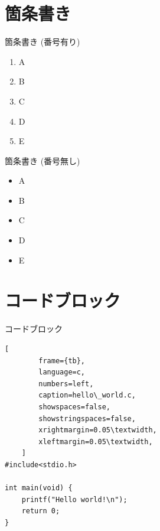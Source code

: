 \documentclass[aspectratio=169]{beamer}
\begin{document}
\section{箇条書き}
\begin{frame}{箇条書き (番号有り)}
    \begin{enumerate}
        \item A
        \item B
        \item C
        \item D
        \item E
    \end{enumerate}
\end{frame}

\begin{frame}{箇条書き (番号無し)}
    \begin{itemize}
        \item A
        \item B
        \item C
        \item D
        \item E
    \end{itemize}
\end{frame}

\section{コードブロック}
\begin{frame}[fragile]{コードブロック}
    \begin{lstlisting}[
        frame={tb},
        language=c,
        numbers=left,
        caption=hello\_world.c,
        showspaces=false,
        showstringspaces=false,
        xrightmargin=0.05\textwidth,
        xleftmargin=0.05\textwidth,
    ]
#include<stdio.h>

int main(void) {
    printf("Hello world!\n");
    return 0;
}
    \end{lstlisting}
\end{frame}
\end{document}
